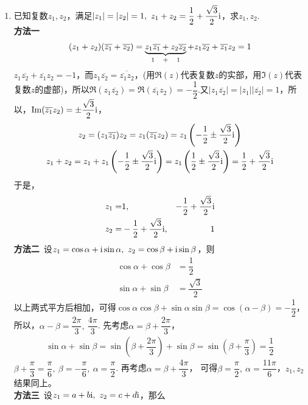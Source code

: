\begin{enumerate}[label={【\textbf{例\thechapter.\arabic*}】},
 leftmargin=\inteval{\myenumleftmargin}pt,
 itemsep=\inteval{\myenumitempsep}pt,
 itemindent=\inteval{\myenumitemindent}pt]
\item \label{复数多元二次方程求解演示}
已知复数$ z_1,z_2 $，满足$ |z_1|=|z_2|=1,\ z_1+z_2=
\dfrac{1}{2}+\dfrac{\sqrt{3}}{2}\mathrm{i} $，求$ z_1,z_2 $. \\
\textbf{方法一}\ 
\begin{align*}
    (z_1+z_2)(\overline{z_1}+\overline{z_2}) =
    \underbrace{z_1\overline{z_1}+z_2\overline{z_2}}_{1\quad+\quad 1}+
    z_1\overline{z_2}+\overline{z_1}z_2=1
\end{align*}
$ z_1\overline{z_2}+\overline{z_1}z_2=-1 $，而$ z_1\overline{z_2}=\overline{\overline{z_1}z_2} $，(用$ \Re (z) $代表复数$ z $的实部，用$ \Im (z) $代表复数$ z $的虚部)，所以$ \Re(z_1\overline{z_2})=\Re(\overline{z_1}z_2)=-\dfrac{1}{2} $.又$ |z_1\overline{z_2}|=|z_1||\overline{z_2}|=1 $，所以，$ \mathrm{Im}(\overline{z_1}z_2)=\pm \dfrac{\sqrt{3}}{2}\mathrm{i} $，
\begin{gather*}
    z_2=(z_1\overline{z_1})z_2=z_1(\overline{z_1}z_2)=z_1\left(
    -\dfrac{1}{2}\pm \dfrac{\sqrt{3}}{2}\mathrm{i}\right) \\
    z_1+z_2=z_1+z_1\left(-\dfrac{1}{2}\pm \dfrac{\sqrt{3}}{2}\mathrm{i}\right)
    =z_1\left(\dfrac{1}{2}\pm \dfrac{\sqrt{3}}{2}\mathrm{i}\right)=
    \dfrac{1}{2}+\dfrac{\sqrt{3}}{2}\mathrm{i} 
\end{gather*}
于是，
\begin{alignat*}{3}
    z_1=& 1, & -\dfrac{1}{2}+ \dfrac{\sqrt{3}}{2}\mathrm{i} \\
    z_2=& -\dfrac{1}{2}+ \dfrac{\sqrt{3}}{2}\mathrm{i}, & 1
\end{alignat*}
\textbf{方法二}\ 设$ z_1=\cos\alpha+\i\sin\alpha,\ z_2=\cos\beta+\i\sin\beta $，则
\begin{align*}
    \cos\alpha+\cos\beta &=\dfrac{1}{2} \\
    \sin\alpha+\sin\beta &=\dfrac{\sqrt{3}}{2} 
\end{align*}
以上两式平方后相加，可得$ \cos\alpha\cos\beta+\sin\alpha\sin\beta=\cos(\alpha
-\beta)=-\dfrac{1}{2} $，所以，$ \alpha-\beta=\dfrac{2\pi}{3},\ \dfrac{4\pi}{3} $.
先考虑$ \alpha=\beta+\dfrac{2\pi}{3} $，
\begin{align*}
    \sin\alpha+\sin\beta =\sin\left(\beta+\dfrac{2\pi}{3}\right) +
    \sin\beta =\sin\left(\beta+\dfrac{\pi}{3}\right) =\dfrac{1}{2}
\end{align*}
$ \beta+\dfrac{\pi}{3}=\dfrac{\pi}{6},\ \beta=-\dfrac{\pi}{6},
\ \alpha=\dfrac{\pi}{2} $. 再考虑$ \alpha=\beta+\dfrac{4\pi}{3} $，
可得$ \beta=\dfrac{\pi}{2},\ \alpha=\dfrac{11\pi}{6} $，$ z_1,z_2 $结果同上。\\
\textbf{方法三}\ 设$ z_1=a+b\i,\ z_2=c+d\i $，那么

\end{enumerate}
